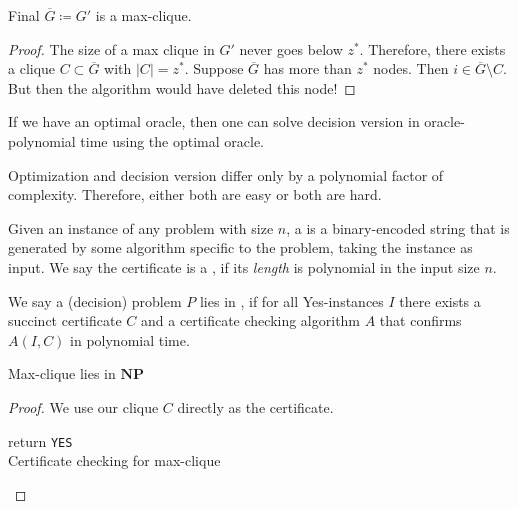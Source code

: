 \begin{theorem}
    Final $\overline{G} \coloneqq  G'$ is a max-clique.
\end{theorem}
\begin{proof}
    The size of a max clique in $G'$ never goes below $z^*$.
    Therefore, there exists a clique $C \subset \overline{G}$ with $|C|=z^*$.
    Suppose $\overline{G}$ has more than $z^*$ nodes. Then $i \in \overline{G} \setminus C$.
    But then the algorithm would have deleted this node!
\end{proof}
\begin{corollary}
    If we have an optimal oracle, then one can solve decision version in oracle-polynomial time using the optimal oracle.
\end{corollary}
\begin{conclusion}
    Optimization and decision version differ only by a polynomial factor of complexity.
    Therefore, either both are easy or both are hard.
\end{conclusion}
\begin{definition}[Certificate]
    Given an instance of any problem with size $n$,
    a  is a binary-encoded string that is generated by some algorithm specific to the problem, taking the instance as input.
    We say the certificate is a , if its \emph{length} is polynomial in the input size $n$.
\end{definition}
\begin{definition}[$\NP$]
    We say a (decision) problem $P$ lies in \vocab[NP]{$\NP$},
    if for all Yes-instances $I$ there exists a succinct certificate $C$
    and a certificate checking algorithm $A$ that confirms $A(I,C)$ in polynomial time.
\end{definition}
\begin{theorem}
    Max-clique lies in $\mathbf{NP}$
\end{theorem}
\begin{proof}
    We use our clique $C$ directly as the certificate.\\
    \begin{algorithm}[H]
        \SetAlgoLined
         
        return \texttt{YES}\\
        \caption{Certificate checking for max-clique}
    \end{algorithm} \noindent
\end{proof}
